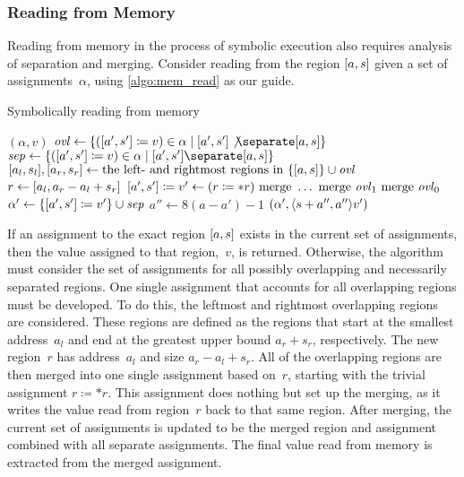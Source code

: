 \subsubsection{Reading from Memory}
Reading from memory in the process of symbolic execution
also requires analysis of separation and merging.
Consider reading from the region $[a,s]$ given a set of assignments~$\alpha$,
using \cref{algo:mem_read} as our guide.
\begin{algorithm}
  \caption{Symbolically reading from memory}\label{algo:mem_read}
  \begin{algorithmic}
        \State\Return $(\alpha,v)$
      \Else
        \State $\var{ovl}\gets\{(\region{a'}{s'}\coloneqq v)\in
        \alpha\mid\region{a'}{s'}\not\separate\region{a}{s}\}$
        \State $\var{sep}\gets\{(\region{a'}{s'}\coloneqq v)\in
        \alpha\mid\region{a'}{s'}\separate\region{a}{s}\}$
        \State $[a_l,s_l],[a_r,s_r]\gets
        \text{the left- and rightmost regions in }\{[a,s]\}\cup\mathit{ovl}$
        \State $r\gets[a_l,a_r-a_l+s_r]$
        \State $[a',s']\coloneqq v'\gets
        (r\coloneqq *r)\text{ merge }\ldots\text{ merge }\mathit{ovl}_1\text{ merge }\mathit{ovl}_0$
        \State $\alpha'\gets\{[a',s']\coloneqq v'\}\cup\mathit{sep}$
        \State $a''\gets8(a-a')-1$
        \State\Return $(\alpha',\langle s+a'',a''\rangle v')$
      \EndIf
    \EndFunction
  \end{algorithmic}
\end{algorithm}
If an assignment to the exact region $[a,s]$
exists in the current set of assignments,
then the value assigned to that region,~$v$, is returned.
Otherwise, the algorithm must consider the set of assignments
for all possibly overlapping and necessarily separated regions.
One single assignment that accounts for all overlapping regions must be developed.
To do this, the leftmost and rightmost overlapping regions are considered.
These regions are defined as the regions that start at the smallest address~$a_l$
and end at the greatest upper bound $a_r+s_r$, respectively.
The new region~$r$ has address~$a_l$ and size $a_r-a_l+s_r$.
All of the overlapping regions are then merged into one single assignment based on~$r$,
starting with the trivial assignment $r\coloneqq *r$.
This assignment does nothing but set up the merging,
as it writes the value read from region~$r$ back to that same region.
After merging, the current set of assignments is updated to be the merged region
and assignment combined with all separate assignments.
The final value read from memory is extracted from the merged assignment.

